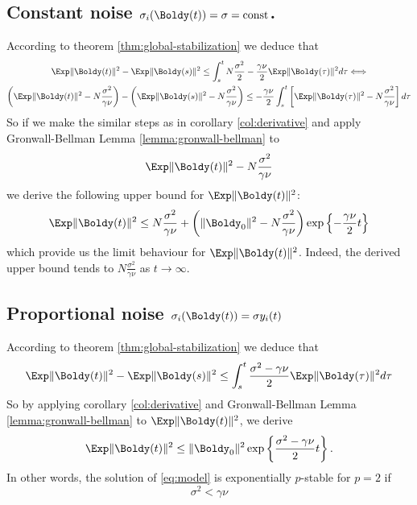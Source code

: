 \subsection{Constant noise $\sigma_i(\Boldy(t)) = \sigma = \operatorname*{const}$.}\label{subsec:constant}
According to theorem \ref{thm:global-stabilization} we deduce that
\begin{multline*}
    \Exp \|\Boldy(t)\|^2  - \Exp \|\Boldy(s)\|^2 \leq  \int_s^t N \frac{\sigma^2}{2} - \frac{\gamma \nu }{2} \Exp \|\Boldy(\tau)\|^2 d\tau \Longleftrightarrow \\
    \left(\Exp \|\Boldy(t)\|^2 - N \frac{\sigma^2}{\gamma \nu}\right) - \left(\Exp \|\Boldy(s)\|^2 - N \frac{\sigma^2}{\gamma \nu }\right)  \leq 
     - \frac{\gamma \nu }{2} \int_s^t  \left[\Exp \|\Boldy(\tau)\|^2 - N \frac{\sigma^2}{\gamma \nu } \right] d\tau
\end{multline*}
So if we make the similar steps as in corollary \ref{col:derivative} and apply Gronwall-Bellman Lemma \ref{lemma:gronwall-bellman} to $$ \Exp \|\Boldy(t)\|^2 - N \frac{\sigma^2}{\gamma \nu}$$ we derive 
the following upper bound for $ \Exp \|\Boldy(t)\|^2$: 
\[
    \Exp \|\Boldy(t)\|^2 \leq N \frac{\sigma^2}{\gamma \nu} +  \left(\|\Boldy_0\|^2 - N \frac{\sigma^2}{\gamma \nu }\right) \exp \left\{-\frac{\gamma \nu }{2} t\right\} 
\]
which provide us the limit behaviour for $\Exp \|\Boldy(t)\|^2$. Indeed, the derived upper bound tends to $N \frac{\sigma^2}{\gamma \nu}$ as $t \rightarrow \infty$.

\subsection{Proportional noise $\sigma_i(\Boldy(t)) = \sigma y_i(t)$}\label{subsec:proportional}
According to theorem \ref{thm:global-stabilization} we deduce that
\begin{equation*}
    \Exp \|\Boldy(t)\|^2 -  \Exp\|\Boldy(s)\|^2 \leq   \int_s^t \frac{\sigma^2 - \gamma \nu }{2} \Exp \|\Boldy(\tau)\|^2 d\tau
\end{equation*}
So by applying corollary \ref{col:derivative} and Gronwall-Bellman Lemma \ref{lemma:gronwall-bellman} to $ \Exp \|\Boldy(t)\|^2 $, we derive
\[
    \Exp \|\Boldy(t)\|^2 \leq  \|\Boldy_0\|^2 \exp\left\{\frac{\sigma^2 - \gamma \nu }{2} t \right\}.
\]
In other words, the solution of \eqref{eq:model} is exponentially $p$-stable for $p=2$ if \[\sigma^2 < \gamma \nu\]
